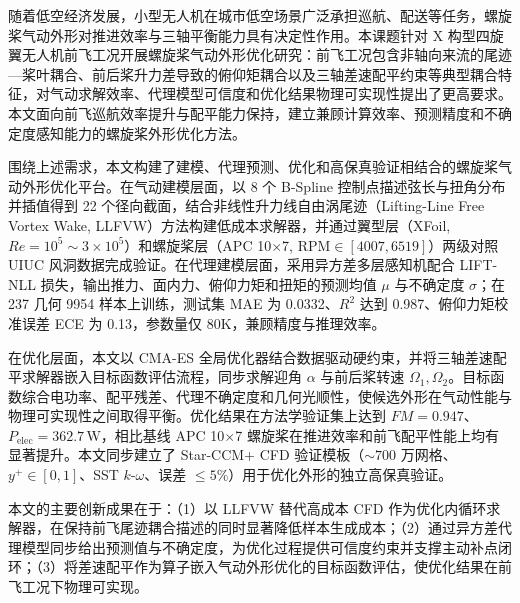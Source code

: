 \begin{cabstract}

随着低空经济发展，小型无人机在城市低空场景广泛承担巡航、配送等任务，螺旋桨气动外形对推进效率与三轴平衡能力具有决定性作用。本课题针对 X 构型四旋翼无人机前飞工况开展螺旋桨气动外形优化研究：前飞工况包含非轴向来流的尾迹—桨叶耦合、前后桨升力差导致的俯仰矩耦合以及三轴差速配平约束等典型耦合特征，对气动求解效率、代理模型可信度和优化结果物理可实现性提出了更高要求。本文面向前飞巡航效率提升与配平能力保持，建立兼顾计算效率、预测精度和不确定度感知能力的螺旋桨外形优化方法。

围绕上述需求，本文构建了建模、代理预测、优化和高保真验证相结合的螺旋桨气动外形优化平台。在气动建模层面，以 8 个 B-Spline 控制点描述弦长与扭角分布并插值得到 22 个径向截面，结合非线性升力线自由涡尾迹（Lifting-Line Free Vortex Wake, LLFVW）方法构建低成本求解器，并通过翼型层（XFoil, $Re=10^5\sim 3\times 10^5$）和螺旋桨层（APC 10$\times$7, $\text{RPM}\in[4007,6519]$）两级对照 UIUC 风洞数据完成验证。在代理建模层面，采用异方差多层感知机配合 LIFT-NLL 损失，输出推力、面内力、俯仰力矩和扭矩的预测均值 $\mu$ 与不确定度 $\sigma$；在 237 几何 9954 样本上训练，测试集 MAE 为 0.0332、$R^2$ 达到 0.987、俯仰力矩校准误差 ECE 为 0.13，参数量仅 80K，兼顾精度与推理效率。

在优化层面，本文以 CMA-ES 全局优化器结合数据驱动硬约束，并将三轴差速配平求解器嵌入目标函数评估流程，同步求解迎角 $\alpha$ 与前后桨转速 $\Omega_1,\Omega_2$。目标函数综合电功率、配平残差、代理不确定度和几何光顺性，使候选外形在气动性能与物理可实现性之间取得平衡。优化结果在方法学验证集上达到 $FM=0.947$、$P_{\text{elec}}=362.7\,\text{W}$，相比基线 APC 10$\times$7 螺旋桨在推进效率和前飞配平性能上均有显著提升。本文同步建立了 Star-CCM+ CFD 验证模板（$\sim 700$ 万网格、$y^+ \in [0,1]$、SST $k$-$\omega$、误差 $\leq 5\%$）用于优化外形的独立高保真验证。

本文的主要创新成果在于：（1）以 LLFVW 替代高成本 CFD 作为优化内循环求解器，在保持前飞尾迹耦合描述的同时显著降低样本生成成本；（2）通过异方差代理模型同步给出预测值与不确定度，为优化过程提供可信度约束并支撑主动补点闭环；（3）将差速配平作为算子嵌入气动外形优化的目标函数评估，使优化结果在前飞工况下物理可实现。

\end{cabstract}

